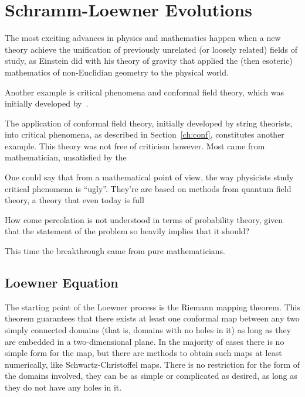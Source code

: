\chapter{Schramm-Loewner Evolutions}
\label{ch:sle}

The most exciting advances in physics and mathematics happen when a new theory
achieve the unification of previously unrelated (or loosely related) fields of
study, as Einstein did with his theory of gravity that applied the (then
esoteric) mathematics of non-Euclidian geometry to the physical world.

Another example is critical phenomena and conformal field theory, which
was initially developed by~\cite{Nahm2000}.

The application of conformal field theory, initially developed by string
theorists, into critical phenomena, as described in Section~\ref{ch:conf},
constitutes another example. This theory was not free of criticism however.
Most came from mathematician, unsatisfied by the 

One could say that from a mathematical point of view, the way physicists study
critical phenomena is ``ugly''. They're are based on methods from quantum field
theory, a theory that even today is full 

How come percolation is not understood in terms of probability theory, given
that the statement of the problem so heavily implies that it should?

This time the breakthrough came from pure mathematicians.


\section{Loewner Equation}
\label{sec:le}


The starting point of the Loewner process is the Riemann mapping theorem. This
theorem guarantees that there exists at least one conformal map between any two
simply connected domains (that is, domains with no holes in it) as long as they
are embedded in a two-dimensional plane. In the majority of cases there is no
simple form for the map, but there are methods to obtain such maps at least
numerically, like Schwartz-Christoffel maps. There is no restriction for the
form of the domains involved, they can be as simple or complicated as desired,
as long as they do not have any holes in it.

